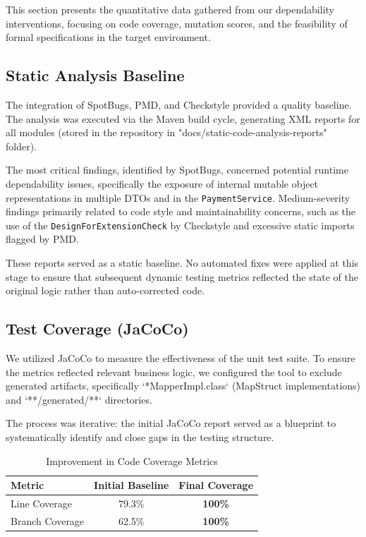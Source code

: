 This section presents the quantitative data gathered from our dependability interventions, focusing on code coverage, mutation scores, and the feasibility of formal specifications in the target environment.

\subsection{Static Analysis Baseline}
The integration of SpotBugs, PMD, and Checkstyle provided a quality baseline. The analysis was executed via the Maven build cycle, generating XML reports for all modules (stored in the repository in "docs/static-code-analysis-reports" folder).

The most critical findings, identified by SpotBugs, concerned potential runtime dependability issues, specifically the exposure of internal mutable object representations in multiple DTOs and in the \texttt{PaymentService}. Medium-severity findings primarily related to code style and maintainability concerns, such as the use of the \texttt{DesignForExtensionCheck} by Checkstyle and excessive static imports flagged by PMD.

These reports served as a static baseline. No automated fixes were applied at this stage to ensure that subsequent dynamic testing metrics reflected the state of the original logic rather than auto-corrected code.

\subsection{Test Coverage (JaCoCo)}
We utilized JaCoCo to measure the effectiveness of the unit test suite. To ensure the metrics reflected relevant business logic, we configured the tool to exclude generated artifacts, specifically `*MapperImpl.class` (MapStruct implementations) and `**/generated/**` directories.

The process was iterative: the initial JaCoCo report served as a blueprint to systematically identify and close gaps in the testing structure.

\begin{table}[h]
    \centering
    \begin{tabular}{lcc}
        \toprule
        \textbf{Metric} & \textbf{Initial Baseline} & \textbf{Final Coverage} \\
        \midrule
        Line Coverage & 79.3\% & \textbf{100\%} \\
        Branch Coverage & 62.5\% & \textbf{100\%} \\
        \bottomrule
    \end{tabular}
    \caption{Improvement in Code Coverage Metrics}
    \label{tab:coverage_evolution}
\end{table}

